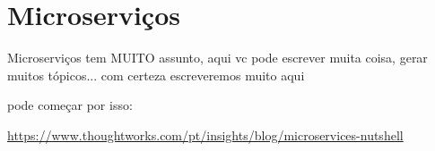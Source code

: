 \chapter{Microserviços}

Microserviços tem MUITO assunto, aqui vc pode escrever muita coisa,
gerar muitos tópicos... com certeza escreveremos muito aqui

pode começar por isso:

\url{https://www.thoughtworks.com/pt/insights/blog/microservices-nutshell}

